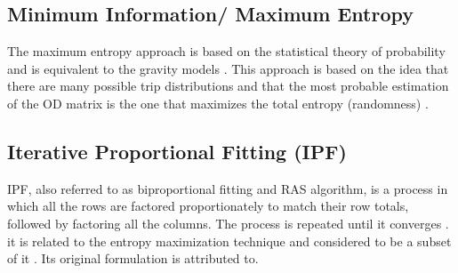 \documentclass[11pt,twoside]{article}
\numberwithin{equation}{section}
\newcommand{\?}{\stackrel{?}{=}}
\begin{document}





\subsection{Minimum Information/ Maximum Entropy}

The maximum entropy approach is based on the statistical theory of probability and is equivalent to the gravity models \citep{wilsonStatisticalTheorySpatial1967}. This approach is based on the idea that there are many possible trip distributions and that the most probable estimation of the OD matrix is the one that maximizes the total entropy (randomness) \citep{aliDynamicOriginDestinationEstimation}.

 



\subsection{Iterative Proportional Fitting (IPF)}

IPF, also referred to as  biproportional fitting and RAS algorithm, is a process in which all the rows are factored proportionately to match their row totals, followed by factoring all the columns. The process is repeated until it converges \citep{navickDistanceBasedModelEstimating1994}. it is related to the entropy maximization technique and considered to be a subset of it \citep{lovelaceEvaluatingPerformanceIterative2015}. Its original formulation is attributed to\citep{demingLeastSquaresAdjustment1940}.
\end{document}
